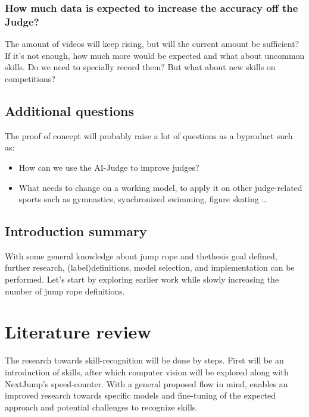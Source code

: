 \subsubsection{How much data is expected to increase the accuracy off the Judge?}
\label{proposal-subsubsec:proposal-intro-question-expected-data-to-increase-accuracy}

The amount of videos will keep rising, but will the current amount be sufficient? If it's not enough, how much more would be expected and what about uncommon skills. Do we need to specially record them? But what about new skills on competitions?

\subsection{Additional questions}
\label{proposal-subsubsec:proposal-intro-question-additional}

The proof of concept will probably raise a lot of questions as a byproduct such as:

\begin{itemize}
    \item How can we use the AI-Judge to improve judges?
    \item What needs to change on a working model, to apply it on other judge-related sports such as gymnastics, synchronized swimming, figure skating \dots
\end{itemize}


\subsection{Introduction summary}
\label{proposal-subsubsec:proposal-intro-summary}

With some general knowledge about jump rope and thethesis goal defined, further research, (label)definitions, model selection, and implementation can be performed.
Let’s start by exploring earlier work while slowly increasing the number of jump rope definitions.



\section{Literature review}%
\label{proposal-sec:literature}


The research towards skill-recognition will be done by steps. First will be an introduction of skills, after which computer vision will be explored along with NextJump's speed-counter. With a general proposed flow in mind, enables an improved research towards specific models and fine-tuning of the expected approach and potential challenges to recognize skills.

